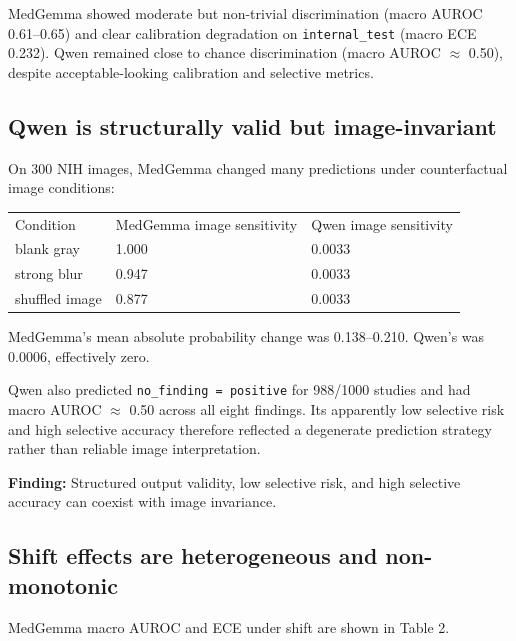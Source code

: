 MedGemma showed moderate but non-trivial discrimination (macro AUROC 0.61--0.65) and clear calibration degradation on \texttt{internal\_test} (macro ECE 0.232). Qwen remained close to chance discrimination (macro AUROC $\approx$ 0.50), despite acceptable-looking calibration and selective metrics.

\subsection{Qwen is structurally valid but image-invariant}

On 300 NIH images, MedGemma changed many predictions under counterfactual image conditions:

\begin{table}[t]
\centering
\small
\begin{tabular}{lll}
\hline
Condition & MedGemma image sensitivity & Qwen image sensitivity \\
blank gray & 1.000 & 0.0033 \\
strong blur & 0.947 & 0.0033 \\
shuffled image & 0.877 & 0.0033 \\
\hline
\end{tabular}
\end{table}


MedGemma’s mean absolute probability change was 0.138--0.210. Qwen’s was 0.0006, effectively zero.

Qwen also predicted \texttt{no\_finding = positive} for 988/1000 studies and had macro AUROC $\approx$ 0.50 across all eight findings. Its apparently low selective risk and high selective accuracy therefore reflected a degenerate prediction strategy rather than reliable image interpretation.

\textbf{Finding:} Structured output validity, low selective risk, and high selective accuracy can coexist with image invariance.

\subsection{Shift effects are heterogeneous and non-monotonic}

MedGemma macro AUROC and ECE under shift are shown in Table 2.

